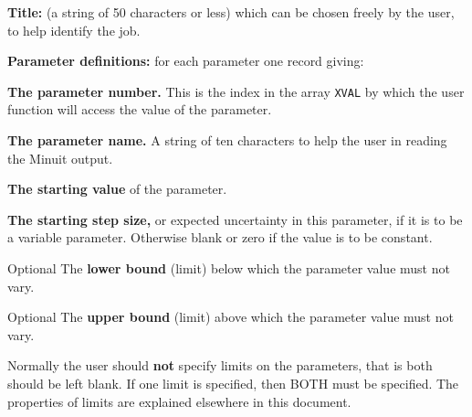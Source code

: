 \begin{UL}
\item {\bf Title:} (a string of 50 characters or less)
      which can be chosen freely by the user, to help identify the job.
\item {\bf Parameter definitions:} for each parameter one record giving:
      \begin{OL}
      \item {\bf The parameter number.}
            This is the index in the array \texttt{XVAL} by which the
            user function  will access the value of the parameter.
      \item {\bf The parameter name.}
            A string of ten characters to help the user in
            reading the Minuit output.
      \item {\bf The starting value} of the parameter.
      \item {\bf The starting step size,}
             or expected uncertainty in this parameter,
             if it is to be a variable parameter. Otherwise blank or zero if the
             value is to be constant.
      \item [Optional] The {\bf lower bound}
            (limit) below which the parameter value must not vary.
      \item [Optional] The {\bf upper bound}
            (limit) above which the parameter value must not vary.
      \end{OL}
      Normally the user should {\bf not} specify limits on the parameters, that is
      both should be left blank. If one limit is specified, then BOTH must
      be specified. The properties of limits are explained elsewhere
      in this document.
 

\end{UL}
